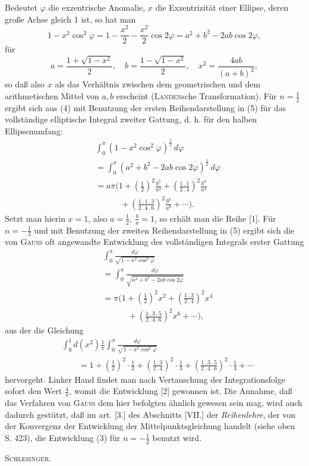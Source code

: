 Bedeutet \(\varphi\) die exzentrische Anomalie, \(x\) die Exzentrizität einer Ellipse, deren große Achse gleich 1 ist, so hat man
\[
1-x^2\cos^2\varphi=1-\frac{x^2}{2}-\frac{x^2}{2}\cos2\varphi=a^2+b^2-2ab\cos2\varphi,
\]
\noindent für
\[
a=\frac{1+\sqrt{1-x^2}}2,\quad b=\frac{1-\sqrt{1-x^2}}2,\quad x^2=\frac{4ab}{(a+b)^2},
\]
\noindent so daß also \(x\) als das Verhältnis zwischen dem geometrischen und dem arithmetischen Mittel von \(a,b\) erscheint (\textsc{Landen}sche Transformation). Für \(n=\frac12\) ergibt sich aus (4) mit Benutzung der ersten Reihendarstellung in (5) für das vollständige elliptische Integral zweiter Gattung, d. h. für den halben Ellipsenumfang:
\[
\begin{aligned}
&\int_0^\pi(1-x^2\cos^2\varphi)^{\frac12}\,d\varphi\\
&=\int_0^\pi(a^2+b^2-2ab\cos2\varphi)^{\frac12}\,d\varphi\\
&=a\pi\biggl(1+\left(\frac12\right)^2\frac{b^2}{a^2}+\left(\frac{1\,.\,1}{2\,.\,4}\right)^2\frac{b^4}{a^4}\\
&\hspace{3em}+\left(\frac{1\,.\,1\,.\,3}{2\,.\,4\,.\,6}\right)^2\frac{b^6}{a^6}+\cdots\biggr).
\end{aligned}
\]
\noindent Setzt man hierin \(x=1\), also \(a=\frac12,\ \frac ba=1\), so erhält man die Reihe [1]. Für \(n=-\frac12\) und mit Benutzung der zweiten Reihendarstellung in (5) ergibt sich die von \textsc{Gauss} oft angewandte Entwicklung des vollständigen Integrals erster Gattung
\[
\begin{aligned}
&\int_0^\pi\frac{d\varphi}{\sqrt{1-x^2\cos^2\varphi}}\\
&=\int_0^\pi\frac{d\varphi}{\sqrt{a^2+b^2-2ab\cos2\varphi}}\\
&=\pi\biggl(1+\left(\frac12\right)^2x^2+\left(\frac{1\,.\,3}{2\,.\,4}\right)^2x^4\\
&\hspace{3em}+\left(\frac{1\,.\,3\,.\,5}{2\,.\,4\,.\,6}\right)^2x^6+\cdots\biggr),
\end{aligned}
\]
\noindent aus der die Gleichung
\[
\begin{aligned}
&\int_0^1d(x^2)\frac1\pi\int_0^\pi\frac{d\varphi}{\sqrt{1-x^2\cos^2\varphi}}\\
&\qquad=1+\left(\frac12\right)^2\cdot\frac12+\left(\frac{1\,.\,3}{2\,.\,4}\right)^2\cdot\frac13+\left(\frac{1\,.\,3\,.\,5}{2\,.\,4\,.\,6}\right)^2\cdot\frac14+\cdots
\end{aligned}
\]
\noindent hervorgeht. Linker Hand findet man nach Vertauschung der Integrationsfolge sofort den Wert \(\frac4\pi\), womit die Entwicklung [2] gewonnen ist. Die Annahme, daß das Verfahren von \textsc{Gauss} dem hier befolgten ähnlich gewesen sein mag, wird auch dadurch gestützt, daß im art. [3.] des Abschnitts [VII.] der \textit{Reihenlehre}, der von der Konvergenz der Entwicklung der Mittelpunktsgleichung handelt (siehe oben S. 423), die Entwicklung (3) für \(n=-\frac12\) benutzt wird.
\par\noindent\hfill\textsc{Schlesinger.}
\par\endgroup
